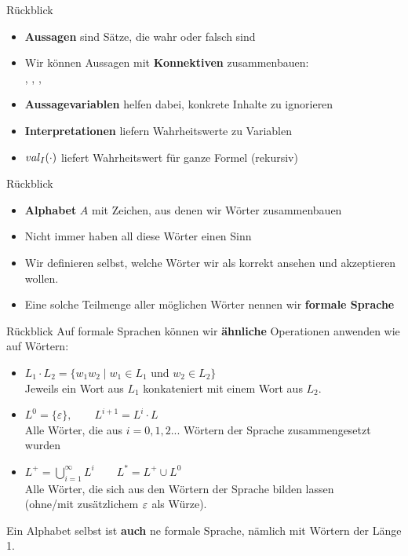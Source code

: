 \framePrevEpisode

\begin{frame}{Rückblick}
	\begin{itemize}
		\item \textbf{Aussagen} sind Sätze, die wahr oder falsch sind
		\item Wir können Aussagen mit \textbf{Konnektiven} zusammenbauen: \\
		\bund, \boder, \bnot, \bimp
		\item \textbf{Aussagevariablen} helfen dabei, konkrete Inhalte zu ignorieren 
		\item \textbf{Interpretationen} liefern Wahrheitswerte zu Variablen
		\item $val_I(\cdot)$ liefert Wahrheitswert für ganze Formel (rekursiv)
	\end{itemize}
\end{frame}

\begin{frame}{Rückblick}
	\begin{itemize}
		\item \textbf{Alphabet} $A$ mit Zeichen, aus denen wir Wörter zusammenbauen
		\item Nicht immer haben all diese Wörter einen Sinn
		\item Wir definieren selbst, welche Wörter wir als korrekt ansehen und akzeptieren wollen.
		\item Eine solche Teilmenge aller möglichen Wörter nennen wir \textbf{formale Sprache}
	\end{itemize}
\end{frame}



\begin{frame}{Rückblick}
	Auf formale Sprachen können wir \textbf{ähnliche} Operationen anwenden wie auf Wörtern:
	\begin{itemize}
		\item $L_1 \cdot L_2 = \{w_1 w_2 \mid w_1 \in L_1 \text{ und } w_2 \in L_2 \}$\\
		Jeweils ein Wort aus $L_1$ konkateniert mit einem Wort aus $L_2$.
		\pause
		\item $L^0 = \{\varepsilon \}, \qquad L^{i+1} = L^i \cdot L$\\
		Alle Wörter, die aus $i = 0,1,2...$ Wörtern der Sprache zusammengesetzt wurden
		\pause
		\item $L^+ = \bigcup \limits_{i=1}^\infty L^i \qquad L^* = L^+ \cup L^0$\\
		Alle Wörter, die sich aus den Wörtern der Sprache bilden lassen \\ 
		(ohne/mit zusätzlichem $\varepsilon$ als Würze).
	\end{itemize}
	Ein Alphabet selbst ist \textbf{auch} ne formale Sprache, nämlich mit Wörtern der Länge 1.
\end{frame}

